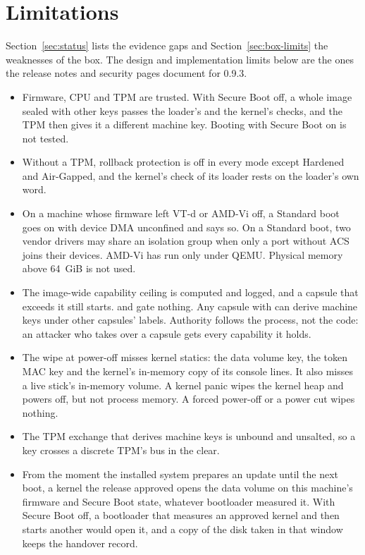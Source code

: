 \section{Limitations}\label{sec:limits}

Section~\ref{sec:status} lists the evidence gaps and Section~\ref{sec:box-limits} the weaknesses of the box. The design and implementation limits below are the ones the release notes and security pages document for 0.9.3.

\begin{itemize}
\item Firmware, CPU and TPM are trusted. With Secure Boot off, a whole image sealed with other keys passes the loader's and the kernel's checks, and the TPM then gives it a different machine key. Booting with Secure Boot on is not tested.
\item Without a TPM, rollback protection is off in every mode except Hardened and Air-Gapped, and the kernel's check of its loader rests on the loader's own word.
\item On a machine whose firmware left VT-d or AMD-Vi off, a Standard boot goes on with device DMA unconfined and says so. On a Standard boot, two vendor drivers may share an isolation group when only a port without ACS joins their devices. AMD-Vi has run only under QEMU. Physical memory above 64~GiB is not used.
\item The image-wide capability ceiling is computed and logged, and a capsule that exceeds it still starts.  and  gate nothing. Any capsule with  can derive machine keys under other capsules' labels. Authority follows the process, not the code: an attacker who takes over a capsule gets every capability it holds.
\item The wipe at power-off misses kernel statics: the data volume key, the token MAC key and the kernel's in-memory copy of its console lines. It also misses a live stick's in-memory volume. A kernel panic wipes the kernel heap and powers off, but not process memory. A forced power-off or a power cut wipes nothing.
\item The TPM exchange that derives machine keys is unbound and unsalted, so a key crosses a discrete TPM's bus in the clear.
\item From the moment the installed system prepares an update until the next boot, a kernel the release approved opens the data volume on this machine's firmware and Secure Boot state, whatever bootloader measured it. With Secure Boot off, a bootloader that measures an approved kernel and then starts another would open it, and a copy of the disk taken in that window keeps the handover record.

\end{itemize}
